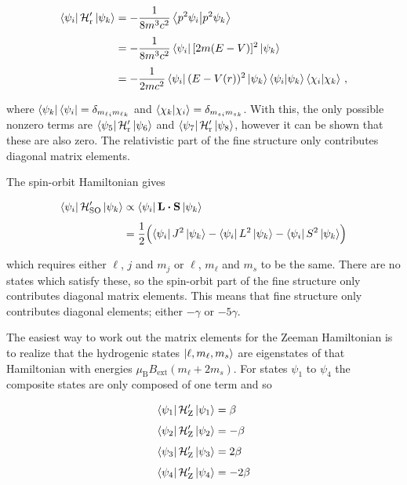\documentclass[12pt, titlepage]{article}
\begin{document}
\begin{align*}
	\bra{\psi_i}\mathcal{H}_\text{r}^\prime\ket{\psi_k} &= -\frac{1}{8m^3c^2}\bra{p^2\psi_i}\ket{p^2\psi_k} \\[4pt]
	&= -\frac{1}{8m^3c^2}\bra{\psi_i}[2m(E-V)]^2\ket{\psi_k} \\[4pt]
	&= -\frac{1}{2mc^2}\bra{\psi_i}(E-V(r))^2\ket{\psi_k}\bra{\psi_i}\ket{\psi_k}\bra{\chi_i}\ket{\chi_k}\,,
\end{align*}

where $\bra{\psi_k}\bra{\psi_i} = \delta_{{m_\ell}_i{m_\ell}_k}$ and $\bra{\chi_k}\ket{\chi_i} = \delta_{{m_s}_i {m_s}_k}$. With this, the only possible nonzero terms are $\bra{\psi_5}\mathcal{H}_\text{r}^\prime\ket{\psi_6}$ and $\bra{\psi_7}\mathcal{H}_\text{r}^\prime\ket{\psi_8}$, however it can be shown that these are also zero. The relativistic part of the fine structure only contributes diagonal matrix elements.

The spin-orbit Hamiltonian gives

\begin{align*}
	\bra{\psi_i}\mathcal{H}_\text{SO}^\prime\ket{\psi_k} &\propto \bra{\psi_i}\vb{L}\vdot\vb{S}\ket{\psi_k} \\[4pt]
	&= \frac{1}{2}\Bigl(\bra{\psi_i}J^2\ket{\psi_k} - \bra{\psi_i}L^2\ket{\psi_k} - \bra{\psi_i}S^2\ket{\psi_k}\Bigr)
\end{align*}

which requires either $\ell$, $j$ and $m_j$ or $\ell$, $m_\ell$ and $m_s$ to be the same. There are no states which satisfy these, so the spin-orbit part of the fine structure only contributes diagonal matrix elements. This means that fine structure only contributes diagonal elements; either $-\gamma$ or $-5\gamma$.

The easiest way to work out the matrix elements for the Zeeman Hamiltonian is to realize that the hydrogenic states $\ket{\ell, m_\ell, m_s}$ are eigenstates of that Hamiltonian with energies $\mu_\text{B}B_\text{ext}(m_\ell + 2m_s)$. For states $\psi_1$ to $\psi_4$ the composite states are only composed of one term and so 

\begin{align*}
	\bra{\psi_1}\mathcal{H}_\text{Z}^\prime\ket{\psi_1} &= \beta \\[4pt]
	\bra{\psi_2}\mathcal{H}_\text{Z}^\prime\ket{\psi_2} &= -\beta \\[4pt]
	\bra{\psi_3}\mathcal{H}_\text{Z}^\prime\ket{\psi_3} &= 2\beta \\[4pt]
	\bra{\psi_4}\mathcal{H}_\text{Z}^\prime\ket{\psi_4} &= -2\beta 
\end{align*}
\end{document}
